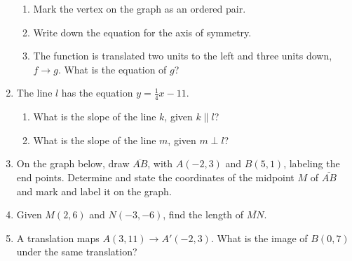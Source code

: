 \documentclass[12pt, twoside]{article}
\begin{document}
\begin{enumerate}
\begin{enumerate}
  \item Mark the vertex on the graph as an ordered pair.
  \item Write down the equation for the axis of symmetry. \vspace{1.5cm}
  \item The function is translated two units to the left and three units down, $f \rightarrow g$. What is the equation of $g$?
\end{enumerate}


\newpage

  \item The line $l$ has the equation $y=\frac{1}{4} x-11$.
  \begin{enumerate}
    \item What is the slope of the line $k$, given $k \parallel l$?
    \vspace{1cm}
    \item What is the slope of the line $m$, given $m \perp l$?
    \vspace{1cm}
  \end{enumerate}

  \item On the graph below, draw $\overline{AB}$, with $A(-2,3)$ and $B(5,1)$, labeling the end points. Determine and state the coordinates of the midpoint $M$ of $\overline{AB}$ and mark and label it on the graph.\\
    \vspace{2cm}

  \item Given $M(2,6)$ and $N(-3,-6)$, find the length of $\overline{MN}$.
      \vspace{4cm}

  \item A translation maps $A(3,11) \rightarrow A'(-2,3)$. What is the image of $B(0,7)$ under the same translation?  \vspace{3cm}



\end{enumerate}
\end{document}
